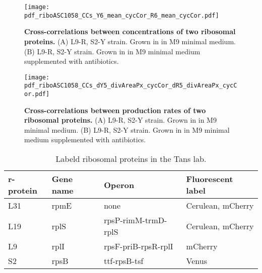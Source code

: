 

\begin{figure}
    \centering
    \texttt{[image: pdf\_riboASC1058\_CCs\_Y6\_mean\_cycCor\_R6\_mean\_cycCor.pdf]}
    \caption{ 
        \textbf{Cross-correlations between concentrations of two ribosomal proteins.}
        (A) L9-R, S2-Y strain. Grown in in M9 minimal medium.
        (B) L9-R, S2-Y strain. Grown in in M9 minimal medium supplemented with antibiotics.
    }
    \label{fig:ribo:CCsEERiboribo}
\end{figure}

\begin{figure}
    \centering
    \texttt{[image: pdf\_riboASC1058\_CCs\_dY5\_divAreaPx\_cycCor\_dR5\_divAreaPx\_cycCor.pdf]}
    \caption{ 
        \textbf{Cross-correlations between production rates of two ribosomal proteins.}
        (A) L9-R, S2-Y strain. Grown in in M9 minimal medium.
        (B) L9-R, S2-Y strain. Grown in in M9 minimal medium supplemented with antibiotics.
    }
    \label{fig:ribo:CCsPPRiboribo}
\end{figure}








    






			

\begin{table}                       
\begin{tabular}{ l l l l }
    \centering
    r-protein & Gene name & Operon & Fluorescent label \\ 
    \hline
    L31 & rpmE & none & Cerulean, mCherry \\ 
    L19 & rplS & rpsP-rimM-trmD-rplS & Cerulean, mCherry \\ 
    L9 & rplI & rpsF-priB-rpsR-rplI & mCherry \\ 
    S2 & rpsB & ttf-rpsB-tsf & Venus\\ 

\end{tabular}
    \caption{Labeld ribosomal proteins in the Tans lab. 
    } \label{tab:ribolabeledprots}
\end{table}



